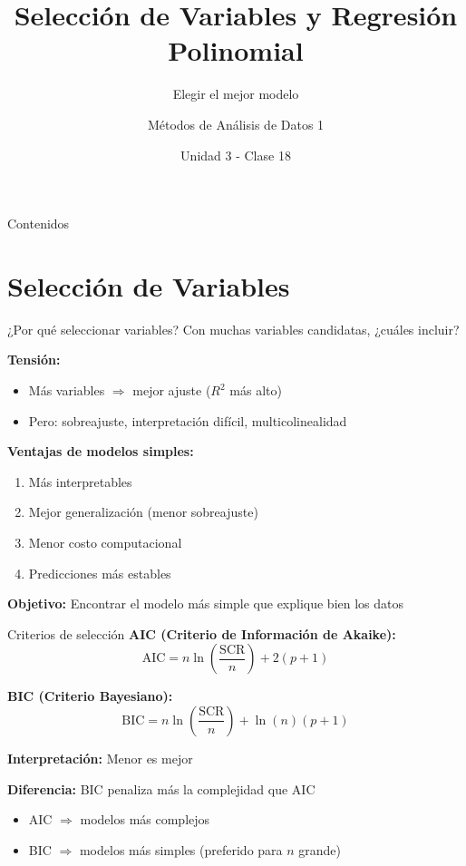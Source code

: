 \documentclass[aspectratio=169]{beamer}
\title{Selección de Variables y Regresión Polinomial}
\subtitle{Elegir el mejor modelo}
\author{Métodos de Análisis de Datos 1}
\institute{Universidad Nacional del Sur}
\date{Unidad 3 - Clase 18}
\begin{document}
\frame{\titlepage}

\begin{frame}{Contenidos}
\tableofcontents
\end{frame}

\section{Selección de Variables}

\begin{frame}{¿Por qué seleccionar variables?}
Con muchas variables candidatas, ¿cuáles incluir?

\vspace{0.3cm}
\textbf{Tensión:}
\begin{itemize}
    \item Más variables $\Rightarrow$ mejor ajuste ($R^2$ más alto)
    \item Pero: sobreajuste, interpretación difícil, multicolinealidad
\end{itemize}

\vspace{0.5cm}
\textbf{Ventajas de modelos simples:}
\begin{enumerate}
    \item Más interpretables
    \item Mejor generalización (menor sobreajuste)
    \item Menor costo computacional
    \item Predicciones más estables
\end{enumerate}

\vspace{0.3cm}
\textbf{Objetivo:} Encontrar el modelo más simple que explique bien los datos
\end{frame}

\begin{frame}{Criterios de selección}
\textbf{AIC (Criterio de Información de Akaike):}
\[
\text{AIC} = n \ln\left(\frac{\text{SCR}}{n}\right) + 2(p+1)
\]

\textbf{BIC (Criterio Bayesiano):}
\[
\text{BIC} = n \ln\left(\frac{\text{SCR}}{n}\right) + \ln(n)(p+1)
\]

\vspace{0.5cm}
\textbf{Interpretación:} Menor es mejor

\vspace{0.3cm}
\textbf{Diferencia:} BIC penaliza más la complejidad que AIC
\begin{itemize}
    \item AIC $\Rightarrow$ modelos más complejos
    \item BIC $\Rightarrow$ modelos más simples (preferido para $n$ grande)
\end{itemize}
\end{frame}
\end{document}
